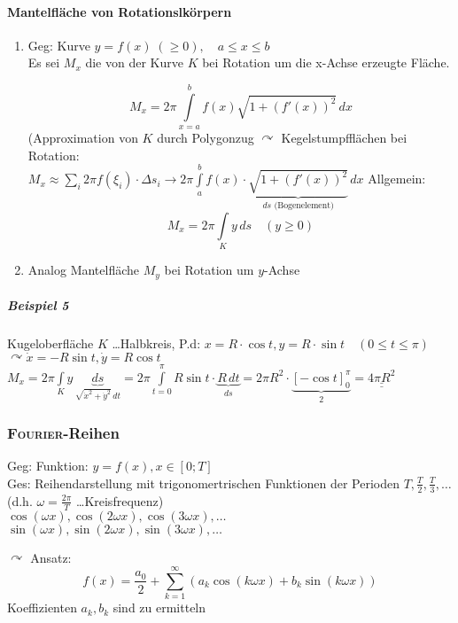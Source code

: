 \documentclass[a4paper]{scrartcl}
\begin{document}
\paragraph{Mantelfläche von Rotationslkörpern}
\begin{enumerate}
\item Geg: Kurve $y=f(x) \; (\geq 0) , \quad a \leq x \leq b $\\
Es sei $M_x$ die von der Kurve $K$ bei Rotation um die x-Achse erzeugte Fläche.

\[M_x= 2 \pi \int\limits_{x=a}^b f(x) \sqrt{1+(f'(x))^2} \, dx\]
(Approximation von $K$ durch Polygonzug $\curvearrowright$ Kegelstumpfflächen bei Rotation:\\
$M_x \approx \sum\limits_i 2 \pi f(\xi_i) \cdot \Delta s_i \rightarrow 2 \pi \int\limits_{a}^{b} f(x) \cdot \underbrace{\sqrt{1+(f'(x))^2}}_{ds \text{ (Bogenelement)}} \, dx$
Allgemein:
\[ M_x = 2\pi \int\limits_{K} y \, ds \quad (y \geq 0) \]

\item Analog Mantelfläche $M_y$ bei Rotation um $y$-Achse
\end{enumerate}

\subparagraph{Beispiel 5} Kugeloberfläche
$K$ \dots Halbkreis, P.d: $x= R \cdot \cos{t} , y= R \cdot \sin{t} \quad (0 \leq t \leq \pi )$\\
$\curvearrowright \dot{x} = - R \sin{t} , \dot{y} = R \cos{t}$\\
$M_x = 2\pi \int\limits_{K} y \, \underbrace{ds}_{\sqrt{\dot{x}^2 + \dot{y}^2 } \, dt} = 2 \pi \int\limits_{t=0}^\pi R \sin{t} \cdot \underbrace{R \, dt}_{ds} = 2 \pi R^2 \cdot \underbrace{\left [ - \cos{t} \right ]_0^\pi }_{2} = \underline{\underline{4 \pi R^2}}$


\subsubsection{\textsc{Fourier}-Reihen}
Geg: Funktion: $y=f(x), x\in [0;T] $\\
Ges: Reihendarstellung mit trigonomertrischen Funktionen der Perioden $T,\frac{T}{2},\frac{T}{3}, \dots$ (d.h. $\omega = \frac{2\pi}{T}$ \dots Kreisfrequenz)\\
$\cos{(\omega x)}, \cos{(2\omega x)}, \cos{(3\omega x)}, \dots $\\
$\sin{(\omega x)}, \sin{(2\omega x)}, \sin{(3\omega x)}, \dots $

$\curvearrowright$ Ansatz:
\[ f(x) = \frac{a_0}{2} + \sum\limits_{k=1}^{\infty} (a_k \cos{(k \omega x)} + b_k \sin{(k \omega x)})\]
Koeffizienten $a_k, b_k$ sind zu ermitteln
\end{document}
